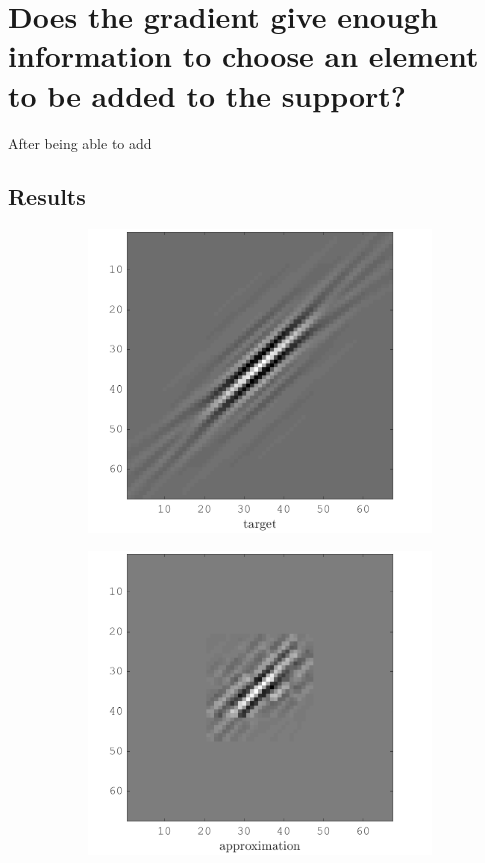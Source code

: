 \section{Does the gradient give enough information to choose an element to be added to the support?}

After being able to add
\subsection{Results}
\begin{figure}[!h]\centering
    \begin{subfigure}[b]{0.49\textwidth}\centering
    \includegraphics[width=\textwidth]{figures/xp/xp_128x128_sc2_angl1_K3_S3_node2_target.png}
    \end{subfigure}
\begin{subfigure}[b]{0.49\textwidth}\centering
\includegraphics[width=\textwidth]{figures/xp/xp_128x128_sc2_angl1_K3_S3_node2_approx.png}

\end{subfigure}
\end{figure}
